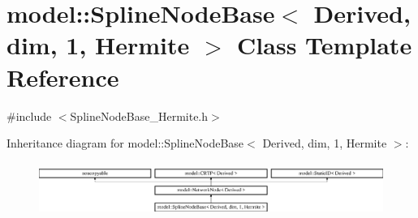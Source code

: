 \hypertarget{classmodel_1_1_spline_node_base_3_01_derived_00_01dim_00_011_00_01_hermite_01_4}{}\section{model\+:\+:Spline\+Node\+Base$<$ Derived, dim, 1, Hermite $>$ Class Template Reference}
\label{classmodel_1_1_spline_node_base_3_01_derived_00_01dim_00_011_00_01_hermite_01_4}


{\ttfamily \#include $<$Spline\+Node\+Base\+\_\+\+Hermite.\+h$>$}

Inheritance diagram for model\+:\+:Spline\+Node\+Base$<$ Derived, dim, 1, Hermite $>$\+:\begin{figure}[H]
\begin{center}
\leavevmode
\includegraphics[height=1.766562cm]{classmodel_1_1_spline_node_base_3_01_derived_00_01dim_00_011_00_01_hermite_01_4}
\end{center}
\end{figure}
